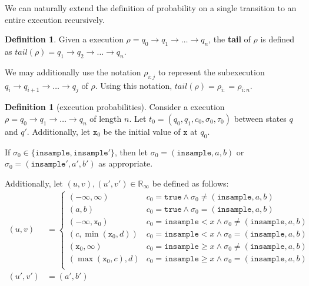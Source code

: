 \documentclass[12pt]{article}
\newcommand{\RR}{\mathbb{R}}
\newcommand{\gguard}[1][x]{\texttt{insample}\geq #1}
\newcommand{\lguard}[1][x]{\texttt{insample} < #1}
\theoremstyle{definition}
\newtheorem{defn}[thm]{Definition}
\begin{document}
We can naturally  extend the definition of probability on a single transition to an entire execution recursively.

\begin{defn}
    Given a execution $\rho = q_0\to q_1\to \ldots \to q_n$, the \textbf{tail} of $\rho$ is defined as $tail(\rho) = q_1\to q_2 \to \ldots\to q_n$. 

    We may additionally use the notation $\rho_{i:j}$ to represent the subexecution $q_i\to q_{i+1}\to \ldots \to q_j$ of $\rho$. Using this notation, $tail(\rho) = \rho_{i:} = \rho_{i:n}$.
\end{defn}

\begin{defn}[execution probabilities]
    Consider a execution $\rho = q_0\to q_1\to \ldots \to q_n$ of length $n$. Let $t_0=(q_0, q_1, c_0, \sigma_0, \tau_0)$ between states $q$ and $q'$. Additionally, let $\texttt{x}_0$ be the initial value of $\texttt{x}$ at $q_0$. 
    
    If $\sigma_0 \in \{\texttt{insample}, \texttt{insample}'\}$, then let $\sigma_0 = (\texttt{insample}, a, b)$ or $\sigma_0 = (\texttt{insample}', a', b')$ as appropriate. 

    Additionally, let $(u, v), (u', v')\in \RR_{\infty}$ be defined as follows:
    \begin{align*}
        (u, v) &= \begin{cases}
        (-\infty, \infty) & c_0=\texttt{true}\land \sigma_0 \neq (\texttt{insample}, a, b)\\
        (a, b) &c_0=\texttt{true}\land \sigma_0 = (\texttt{insample}, a, b)\\
        (-\infty, \texttt{x}_0) & c_0=\lguard\land \sigma_0 \neq (\texttt{insample}, a, b)\\
        (c, \min(\texttt{x}_0, d)) &c_0=\lguard\land \sigma_0 = (\texttt{insample}, a, b)\\
        (\texttt{x}_0, \infty) & c_0=\gguard\land \sigma_0 \neq (\texttt{insample}, a, b)\\
        (\max(\texttt{x}_0, c), d) &c_0=\gguard\land \sigma_0 = (\texttt{insample}, a, b)\\
    \end{cases}\\
    (u', v')& = (a', b')\end{align*}


\end{defn}
\end{document}
